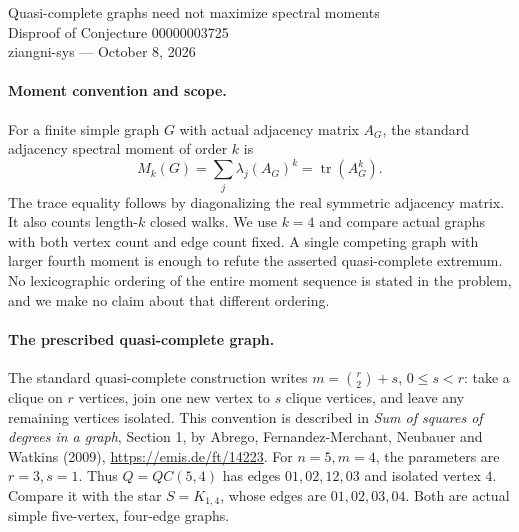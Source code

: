 \documentclass[11pt]{article}
\begin{document}
\begin{center}
{\Large Quasi-complete graphs need not maximize spectral moments}\\[4pt]
Disproof of Conjecture 00000003725\\[4pt]
ziangni-sys --- October 8, 2026
\end{center}
\paragraph{Moment convention and scope.}
For a finite simple graph $G$ with actual adjacency matrix $A_G$,
the standard adjacency spectral moment of order $k$ is
\[
 M_k(G)=\sum_j\lambda_j(A_G)^k=\operatorname{tr}(A_G^k).
\]
The trace equality follows by diagonalizing the real symmetric
adjacency matrix. It also counts length-$k$ closed walks.
We use $k=4$ and compare actual graphs with both vertex count and
edge count fixed. A single competing graph with larger fourth
moment is enough to refute the asserted quasi-complete extremum.
No lexicographic ordering of the entire moment sequence is stated
in the problem, and we make no claim about that different ordering.

\paragraph{The prescribed quasi-complete graph.}
The standard quasi-complete construction writes
$m=\binom{r}{2}+s$, $0\leq s<r$: take a clique on $r$ vertices,
join one new vertex to $s$ clique vertices, and leave any remaining
vertices isolated. This convention is described in
\emph{Sum of squares of degrees in a graph}, Section 1,
by Abrego, Fernandez-Merchant, Neubauer and Watkins (2009),
\url{https://emis.de/ft/14223}.
For $n=5,m=4$, the parameters are $r=3,s=1$.
Thus $Q=QC(5,4)$ has edges $01,02,12,03$ and isolated vertex $4$.
Compare it with the star $S=K_{1,4}$, whose edges are
$01,02,03,04$. Both are actual simple five-vertex, four-edge graphs.
\end{document}
